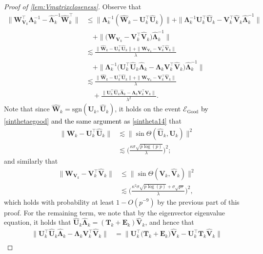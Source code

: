 \documentclass[10pt]{article}
\newcommand{\0}{{\mathbf{0}}}
\newcommand{\1}{{\mathbf{1}}}
\newcommand{\U}{{\mathbf{U}}}
\renewcommand{\t}{^{\top}}
\newcommand{\uhat}{\mathbf{\hat{U}}}
\newcommand{\inv}{^{-1}}
\renewcommand{\hat}{\widehat}
\renewcommand{\hat}{\widehat}
\begin{document}
\begin{proof}[Proof of \cref{lem:Vmatrixcloseness}]
Observe that
\begin{align*}
    \| \mathbf{W}_{\mathbf{V}_k}\t \mathbf{\Lambda}_k\inv - \mathbf{\hat{\Lambda}}_k\inv \mathbf{\hat W}_k\t \| &\leq \| \mathbf{\Lambda}_k\inv ( \mathbf{\hat W}_k - \U_k\t \uhat_k ) \| + \| \mathbf{\Lambda}_k\inv \U_k\t \uhat_k - \mathbf{V}_k\t \mathbf{\hat V}_k \mathbf{\hat{\Lambda}}_k\inv \| \\
    &\quad + \|\big( \mathbf{W}_{\mathbf{V}_k}- \mathbf{V}_k\t \mathbf{\hat V}_k \big)\mathbf{\hat{\Lambda}}_k\inv \| \\
    &\lesssim \frac{\| \mathbf{\hat W}_k - \U_k\t \uhat_k \| + \|\mathbf{W}_{\mathbf{V}_k}- \mathbf{V}_k\t \mathbf{\hat V}_k \| }{\lambda} \\
    &\quad + \| \mathbf{\Lambda}_k\inv\big( \U_k\t \uhat_k \mathbf{\hat{\Lambda}}_k - \mathbf{\Lambda}_k \mathbf{V}_k\t \mathbf{\hat V}_k \big) \mathbf{\hat{\Lambda}}_k\inv \| \\
    &\lesssim \frac{\| \mathbf{\hat W}_k - \U_k\t \uhat_k \| + \|\mathbf{W}_{\mathbf{V}_k}- \mathbf{V}_k\t \mathbf{\hat V}_k \| }{\lambda} \\
    &\quad + \frac{ \| \U_k\t \uhat_k \mathbf{\hat{\Lambda}}_k - \mathbf{\Lambda}_k \mathbf{V}_k\t \mathbf{\hat V}_k \|}{\lambda^2}.
\end{align*}
Note that since $\mathbf{\hat W}_k = \mathrm{sgn}(\U_k,\uhat_k)$, it holds on the event $\mathcal{E}_{\mathrm{Good}}$ \textcolor{black}{by \cref{sinthetaegood} and the same argument as \eqref{sintheta14}} that
\begin{align*}
    \| \mathbf{\hat W}_k - \U_k\t \uhat_k \| &\lesssim \| \sin\Theta(\uhat_k,\U_k) \|^2 \\
    &\lesssim \bigg( \frac{\kappa \sigma \sqrt{p\log(p)}}{\lambda} \bigg)^2;
\end{align*}
and similarly that
\begin{align*}
    \| \mathbf{W}_{\mathbf{V}_k} - \mathbf{V}_k\t\mathbf{\hat V}_k \| &\leq \| \sin\Theta(\mathbf{V}_k ,\mathbf{\hat V}_k ) \|^2 \\
    &\lesssim \bigg( \frac{\kappa^2 \sigma \sqrt{p\log(p)} + \sigma \sqrt{pr}}{\lambda} \bigg)^2,
\end{align*}
which holds with probability at least $1 - O(p^{-9})$ by the previous part of this proof.  For the remaining term, we note that by the eigenvector eigenvalue equation, it holds that $\uhat_k \mathbf{\hat{\Lambda}}_k = (\mathbf{T}_k + \mathbf{E}_k) \mathbf{\hat V}_k$, and hence that
\begin{align*}
    \| \U_k\t \uhat_k \mathbf{\hat{\Lambda}}_k - \mathbf{\Lambda}_k \mathbf{V}_k\t \mathbf{\hat V}_k \| &= \| \U_k\t \big( \mathbf{T}_k + \mathbf{E}_k \big) \mathbf{\hat V}_k - \U_k\t \mathbf{T}_k \mathbf{\hat V}_k \| \\

\end{align*}
\end{proof}
\end{document}
